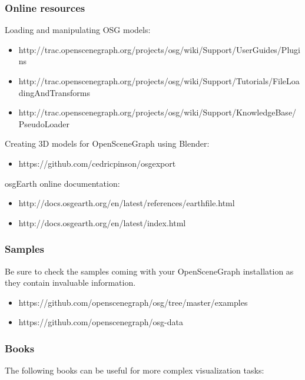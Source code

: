 \subsubsection{Online resources}

Loading and manipulating OSG models:
\begin{itemize}
\item http://trac.openscenegraph.org/projects/osg/wiki/Support/UserGuides/Plugins
\item http://trac.openscenegraph.org/projects/osg/wiki/Support/Tutorials/FileLoadingAndTransforms
\item http://trac.openscenegraph.org/projects/osg/wiki/Support/KnowledgeBase/PseudoLoader
\end{itemize}

Creating 3D models for OpenSceneGraph using Blender:
\begin{itemize}
\item https://github.com/cedricpinson/osgexport
\end{itemize}

osgEarth online documentation:
\begin{itemize}
\item http://docs.osgearth.org/en/latest/references/earthfile.html
\item http://docs.osgearth.org/en/latest/index.html
\end{itemize}

\subsubsection{Samples}
Be sure to check the samples coming with your OpenSceneGraph installation as
they contain invaluable information.
\begin{itemize}
\item https://github.com/openscenegraph/osg/tree/master/examples
\item https://github.com/openscenegraph/osg-data
\end{itemize}

\subsubsection{Books}

The following books can be useful for more complex visualization tasks:

